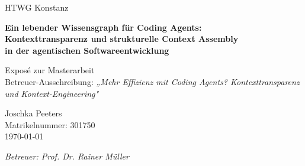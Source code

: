 \documentclass[12pt,a4paper]{scrartcl}
\begin{document}
\begin{titlepage}
  \centering

  \large{HTWG Konstanz}

  \vfill

  {\LARGE\bfseries Ein lebender Wissensgraph für Coding Agents:\\[0.4em]
  Kontexttransparenz und strukturelle Context Assembly\\[0.4em]
  in der agentischen Softwareentwicklung\par}

  \vspace{1.2cm}

  {\large Exposé zur Masterarbeit}\\[0.4em]
  {\normalsize Betreuer-Ausschreibung: \textit{„Mehr Effizienz mit Coding Agents? Kontexttransparenz und Kontext-Engineering"}}

  \vspace{2cm}

  {\large Joschka Peeters}\\[0.5em]
  {\normalsize Matrikelnummer: 301750}\\[0.5em]
  {\normalsize \today}

  \vfill

  \textit{Betreuer: Prof. Dr. Rainer Müller}

\end{titlepage}

\tableofcontents
\newpage








\newpage


\newpage
\printbibliography[heading=bibintoc, title={Literaturverzeichnis}]
\end{document}
